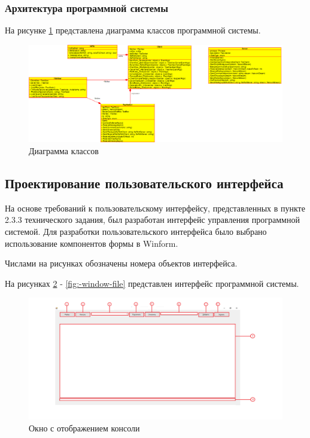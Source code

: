 \subsubsection{Архитектура программной системы}
На рисунке \ref{fig:-class-diagramma} представлена диаграмма классов программной системы.
\begin{figure}
	\centering
	\includegraphics[width=0.9\linewidth]{"images/Диаграмма классов"}
	\caption{Диаграмма классов}
	\label{fig:-class-diagramma}
\end{figure}

\subsection{Проектирование пользовательского интерфейса}

На основе требований к пользовательскому интерфейсу, представленных в пункте 2.3.3 технического задания, был разработан интерфейс управления программной системой. Для разработки пользовательского интерфейса было выбрано использование компонентов формы в Winform.
 
Числами на рисунках обозначены номера объектов интерфейса.

На рисунках \ref{fig:-window-console} - \ref{fig:-window-file} представлен интерфейс программной системы.

\begin{figure}
	\centering
	\includegraphics[width=0.9\linewidth]{"images/Окно с консолью"}
	\caption{Окно с отображением консоли}
	\label{fig:-window-console}
\end{figure}

